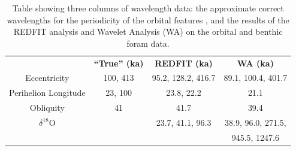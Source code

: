 \documentclass[12pt, onecolumn]{revtex4}    %
\begin{document}
\begin{table}[h!]
\centering
\begin{tabular}{c@{\hskip 20pt}c@{\hskip 20pt}c@{\hskip 20pt}c} 
 \hline
  & \textbf{``True'' (ka)} &\textbf{REDFIT (ka)} & \textbf{WA (ka)} \\ [0.5ex] 
 Eccentricity & 100, 413 & 95.2, 128.2, 416.7 & 89.1, 100.4,  401.7\\
 Perihelion Longitude & 23, 100 & 23.8, 22.2 & 21.1 \\
 Obliquity & 41 & 41.7 & 39.4 \\
 $\delta^{18}$O & & 23.7, 41.1, 96.3  & 38.9, 96.0, 271.5, \\
 & & & 945.5, 1247.6 \\
 \hline
\end{tabular}
\caption{Table showing three columns of wavelength data: the approximate correct wavelengths for the periodicity of the orbital features \cite{campisano_milankovitch}, and the results of the REDFIT analysis and Wavelet Analysis (WA) on the orbital and benthic foram data.}
\vspace{-0.5em}
\label{table:final_results}
\end{table}
\end{document}
